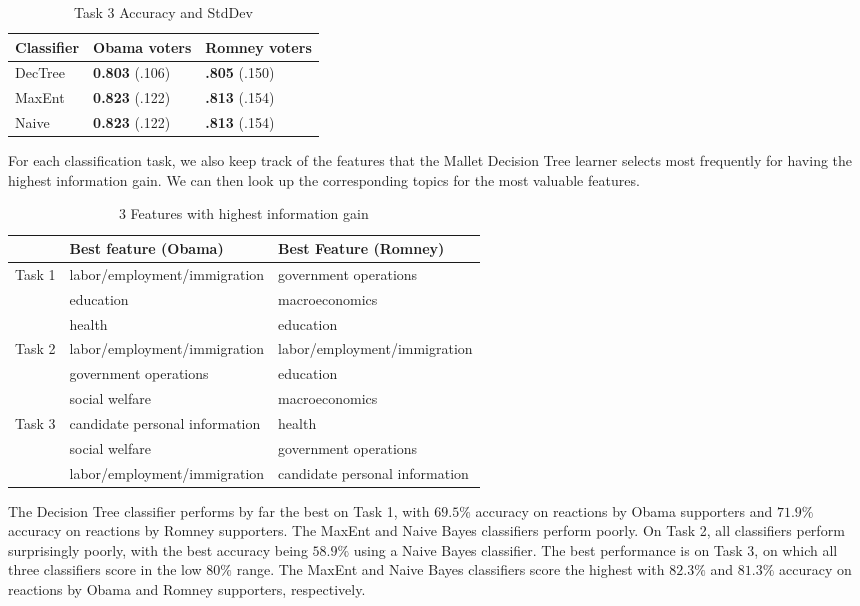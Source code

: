 \begin{table}[H]
\begin{centering}
\begin{tabular}{ l | l | l }
Classifier & Obama voters & Romney voters \\
\hline
DecTree & \textbf{0.803} (.106) &  \textbf{.805} (.150) \\
MaxEnt & \textbf{0.823} (.122) &  \textbf{.813} (.154) \\
Naive & \textbf{0.823} (.122) &  \textbf{.813} (.154) \\
\end{tabular}
\caption{Task 3 Accuracy and StdDev}
\label{tab:task3boydstun}
\end{centering}
\end{table}

For each classification task, we also keep track of the features that the Mallet Decision Tree learner selects most frequently for having the highest information gain. We can then look up the corresponding topics for the most valuable features.

\begin{table*}[H]
\begin{centering}
\begin{tabular}{| l | l | l |}
\hline
  & Best feature (Obama) & Best Feature (Romney) \\
\hline
Task 1 & labor/employment/immigration & government operations \\
	    & education & macroeconomics \\
	    & health & education \\
	    \hline
Task 2 & labor/employment/immigration & labor/employment/immigration \\
	    & government operations & education \\
	    & social welfare & macroeconomics  \\
	    \hline
Task 3 & candidate personal information & health \\
	    & social welfare & government operations \\
	    & labor/employment/immigration & candidate personal information \\
	    \hline
\end{tabular}
\caption{3 Features with highest information gain}
\end{centering}
\end{table*}

The Decision Tree classifier performs by far the best on Task 1, with $69.5\%$  accuracy on reactions by Obama supporters and $71.9\%$ accuracy on reactions by Romney supporters. The MaxEnt and Naive Bayes classifiers perform poorly. On Task 2, all classifiers perform surprisingly poorly, with the best accuracy being $58.9\%$ using a Naive Bayes classifier. The best performance is on Task 3, on which all three classifiers score in the low $80\%$ range. The MaxEnt and Naive Bayes classifiers score the highest with $82.3\%$ and $81.3\%$ accuracy on reactions by Obama and Romney supporters, respectively.

